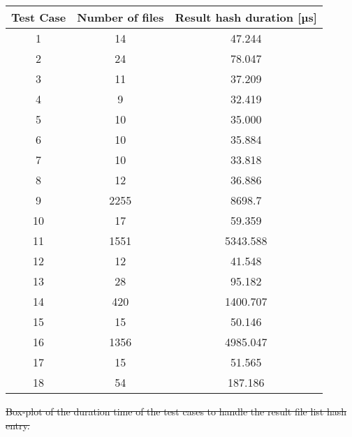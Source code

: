 \documentclass[draft,final]{vutinfth} %
\providecommand{\DIFdeltex}[1]{{\protect\color{red}\sout{#1}}}                      %
\providecommand{\DIFaddbegin}{} %
\providecommand{\DIFdelbegin}{} %
\providecommand{\DIFdelend}{} %
\providecommand{\DIFdelFL}[1]{\DIFdel{#1}} %
\providecommand{\DIFaddendFL}{} %
\providecommand{\DIFdel}[1]{\texorpdfstring{\DIFdeltex{#1}}{}} %
\begin{document}
\begin{itemize}
\begin{table}[]
		\centering
		\DIFaddendFL \begin{tabular}{c|c|c}
			\textbf{Test Case} & \textbf{Number of files} & \textbf{Result hash duration [µs]}  \\ \hline
			1 & 14  & 47.244 \\ \hline 
			2 & 24 & 78.047 \\ \hline
			3 & 11 & 37.209 \\ \hline
			4 & 9 & 32.419 \\ \hline
			5 & 10 & 35.000 \\ \hline
			6 & 10 & 35.884 \\ \hline
			7 & 10 & 33.818 \\ \hline
			8 & 12 & 36.886 \\ \hline
			9 & 2255 & 8698.7 \\ \hline
			10 & 17 & 59.359 \\ \hline
			11 & 1551 & 5343.588 \\ \hline
			12 & 12 & 41.548 \\ \hline
			13 & 28 & 95.182 \\ \hline
			14 & 420 & 1400.707 \\ \hline
			15 & 15 & 50.146 \\ \hline
			16 & 1356 & 4985.047 \\ \hline
			17 & 15 & 51.565 \\ \hline
			18 & 54 & 187.186 \\ 
		\end{tabular}
		\label{Tab:data_result_hash}
	\end{table}
	\DIFdelbegin %
{%
\DIFdelFL{Box-plot of the duration time of the test cases to handle the result file list hash entry.}}
\DIFdelend \DIFaddbegin 


\end{itemize}
\end{document}
